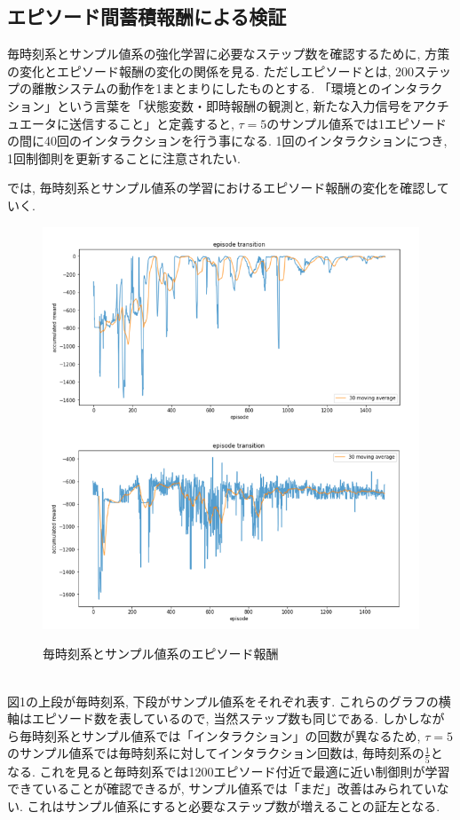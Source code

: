\documentclass{jsarticle}
\begin{document}
\subsection{エピソード間蓄積報酬による検証}
毎時刻系とサンプル値系の強化学習に必要なステップ数を確認するために, 方策の変化とエピソード報酬の変化の関係を見る. ただしエピソードとは, 200ステップの離散システムの動作を1まとまりにしたものとする. 「環境とのインタラクション」という言葉を「状態変数・即時報酬の観測と, 新たな入力信号をアクチュエータに送信すること」と定義すると,  $\tau=5$のサンプル値系では1エピソードの間に40回のインタラクションを行う事になる. 1回のインタラクションにつき, 1回制御則を更新することに注意されたい. \par
では, 毎時刻系とサンプル値系の学習におけるエピソード報酬の変化を確認していく. 
\begin{figure}[h]
	\centering
 	\includegraphics[width=12cm]{episode_reward.png} \label{episode_reward}
 	\caption{毎時刻系とサンプル値系のエピソード報酬}
\end{figure}\\
図1の上段が毎時刻系, 下段がサンプル値系をそれぞれ表す. これらのグラフの横軸はエピソード数を表しているので, 当然ステップ数も同じである. しかしながら毎時刻系とサンプル値系では「インタラクション」の回数が異なるため, $\tau=5$のサンプル値系では毎時刻系に対してインタラクション回数は, 毎時刻系の$\frac{1}{5}$となる. これを見ると毎時刻系では1200エピソード付近で最適に近い制御則が学習できていることが確認できるが, サンプル値系では「まだ」改善はみられていない. これはサンプル値系にすると必要なステップ数が増えることの証左となる.\newpage
\end{document}
